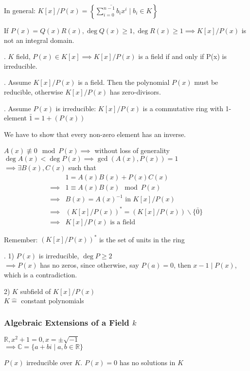 In general: $K[x] / P(x) = \left\{ \overline{\sum_{i=0}^{n-1} b_i x^i} \mid b_i \in K\right\}$

If $P(x) = Q(x)R(x), \deg Q(x) \geq 1, \deg R(x) \geq 1 \implies K[x] / P(x)$ is not an integral domain.

\Theorem.
$K$ field, $P(x) \in K[x] \implies K[x] / P(x)$ is a field if and only if P(x) is irreducible.

\ProofForward.
Assume $K[x] / P(x)$ is a field. Then the polynomial $P(x)$ must be reducible, otherwise $K[x] / P(x)$ has zero-divisors.

\ProofBackward. Assume $P(x)$ is irreducible:
$K[x] / P(x)$ is a commutative ring with 1-element $\bar{1} = 1+ (P(x))$

We have to show that every non-zero element has an inverse.

$A(x) \not\equiv 0 \mod P(x) \implies $ without loss of generality $\deg A(x) < \deg P(x) \implies \gcd(A(x), P(x)) = 1$\\
$\implies \exists B(x), C(x)$ such that
\begin{align*}
  & 1 = A(x)B(x) + P(x)C(x)\\
  \implies & 1 \equiv A(x) B(x) \mod P(x) \\
  \implies & B(x) = A(x)^{-1} \text{ in } K[x] / P(x) \\
  \implies & (K[x] / P(x))^{*} = (K[x]/P(x)) \backslash \{\bar{0}\} \\
  \implies & K[x] / P(x) \text{ is a field}
\end{align*}

Remember: $(K[x] / P(x))^{*}$ is the set of units in the ring

\Remark.
1) $P(x)$ is irreducible, $\deg P \geq 2$ \\
$\implies P(x)$ has no zeros, since otherwise, say $P(a) = 0$, then $x -1 ∣ P(x)$, which is a contradiction.

2) $K$ subfield of $K[x]/P(x)$\\
$K\hat{=}$ constant polynomials

\subsubsection{Algebraic Extensions of a Field $k$}
$\mathbb{R}, x^2 +1 = 0, x = \pm \sqrt{-1}$ \\
$\implies \mathbb{C} = \{a+bi \mid a,b \in \mathbb{R} \}$

$P(x)$ irreducible over $K$. $P(x) = 0$ has no solutions in $K$

